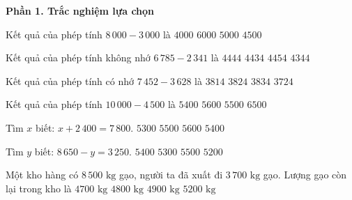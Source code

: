 \textbf{Phần 1. Trắc nghiệm lựa chọn}

\begin{ex} %
Kết quả của phép tính $8\,000 - 3\,000$ là
\choice
{$4000$}
{$6000$}
{\True $5000$}
{$4500$}
\end{ex}

\begin{ex} %
Kết quả của phép tính không nhớ $6\,785 - 2\,341$ là
\choice
{\True $4444$}
{$4434$}
{$4454$}
{$4344$}
\end{ex}

\begin{ex} %
Kết quả của phép tính có nhớ $7\,452 - 3\,628$ là
\choice
{$3814$}
{\True $3824$}
{$3834$}
{$3724$}
\end{ex}

\begin{ex} %
Kết quả của phép tính $10\,000 - 4\,500$ là
\choice
{$5400$}
{$5600$}
{\True $5500$}
{$6500$}
\end{ex}

\begin{ex} %
Tìm $x$ biết: $x + 2\,400 = 7\,800$.
\choice
{$5300$}
{$5500$}
{$5600$}
{\True $5400$}
\end{ex}

\begin{ex} %
Tìm $y$ biết: $8\,650 - y = 3\,250$.
\choice
{\True $5400$}
{$5300$}
{$5500$}
{$5200$}
\end{ex}

\begin{ex} %
Một kho hàng có $8\,500\text{ kg}$ gạo, người ta đã xuất đi $3\,700\text{ kg}$ gạo. Lượng gạo còn lại trong kho là
\choice
{$4700\text{ kg}$}
{\True $4800\text{ kg}$}
{$4900\text{ kg}$}
{$5200\text{ kg}$}
\end{ex}

